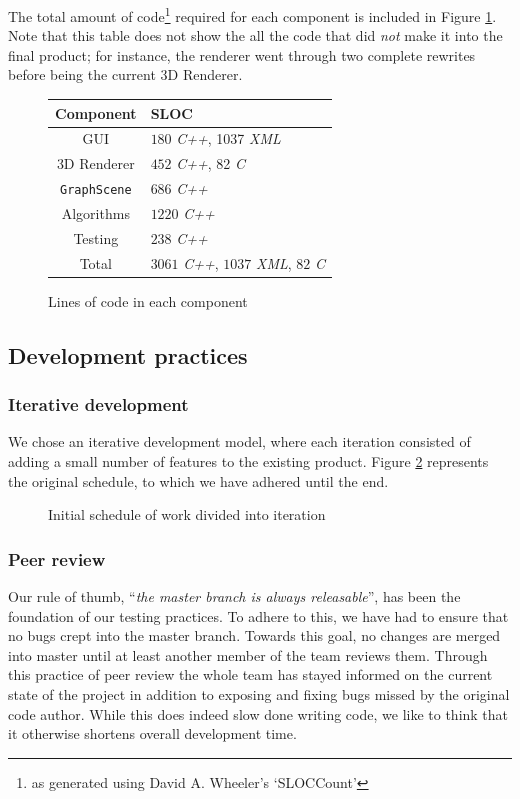 \documentclass[a4paper,11pt,titlepage]{article}
\newcommand{\code}[1]{\texttt{#1}}
\newcommand{\buzz}[1]{\emph{#1}}
\begin{document}
The total amount of code\footnote{as generated using David
  A. Wheeler's `SLOCCount'} required for each component is included in
Figure \ref{fig:sloc}. Note that this table does not show the all the
code that did \emph{not} make it into the final product; for instance,
the renderer went through two complete rewrites before being the
current 3D Renderer.

\begin{figure}[ht!]
  \centering
  \begin{tabular}{c|l}
    Component         & SLOC \\
    \hline
    GUI               & $180$ \buzz{C++}, 1037 \buzz{XML}\\
    3D Renderer       & $452$ \buzz{C++}, 82 \buzz{C}\\
    \code{GraphScene} & $686$ \buzz{C++}\\
    Algorithms        & $1220$ \buzz{C++}\\
    Testing           & $238$ \buzz{C++} \\
    \hline
    Total             & $3061$ \buzz{C++}, $1037$ \buzz{XML}, $82$ \buzz{C}
  \end{tabular}
  \caption{Lines of code in each component}
  \label{fig:sloc}
\end{figure}

\subsection{Development practices}
\label{practices}

\subsubsection{Iterative development}

We chose an iterative development model, where each iteration
consisted of adding a small number of features to the existing
product.  Figure \ref{fig:iterations} represents the original
schedule, to which we have adhered until the end.

\begin{figure}[ht!]
  \centering
  
  \caption{Initial schedule of work divided into iteration}
  \label{fig:iterations}
\end{figure}

\subsubsection{Peer review}
Our rule of thumb, ``\emph{the master branch is always releasable}'',
has been
the foundation of our testing practices. To adhere to this, we have
had to ensure that no bugs crept into the master branch. Towards this
goal, no changes are merged into master until at least another member
of the team reviews them. Through this practice of peer review the
whole team has stayed informed on the current state of the project
in addition to exposing and fixing bugs missed by the original code
author. While this does indeed slow done writing code, we like to
think that it otherwise shortens overall development time.
\end{document}

